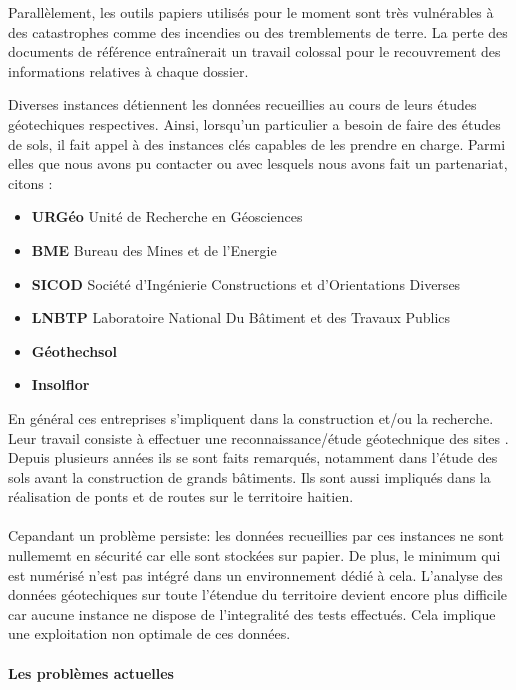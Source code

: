 \par
Parallèlement, les outils papiers utilisés pour le moment sont très vulnérables à des
catastrophes comme des incendies ou des tremblements de terre. La perte 
des documents de référence entraînerait un travail
colossal pour le recouvrement des informations relatives à chaque 
dossier.
\par
Diverses instances détiennent les données recueillies au cours
de leurs études géotechiques respectives. 
Ainsi, lorsqu’un particulier a besoin de faire des études de sols, il 
fait appel à des instances clés capables de les prendre en charge. 
Parmi elles que nous avons pu contacter ou avec lesquels nous avons fait un partenariat, citons :
\begin{itemize}
    \item \textbf{URGéo}
    Unité de Recherche en Géosciences 
    \item \textbf{BME}
    Bureau des Mines et de l’Energie
    \item \textbf{SICOD}
    Société d’Ingénierie Constructions et d’Orientations Diverses
    \item \textbf{LNBTP}
    Laboratoire National Du Bâtiment et des Travaux Publics 
    \item \textbf{Géothechsol}
    \item \textbf{Insolflor}
\end{itemize}   

\par
En général ces entreprises s'impliquent dans la construction et/ou la recherche. 
Leur travail consiste à effectuer une reconnaissance/étude géotechnique des sites .
Depuis plusieurs années ils se sont faits remarqués, notamment dans
l'étude des sols avant la construction de grands bâtiments. Ils sont aussi impliqués
dans la réalisation de ponts et de routes sur le territoire
haitien. 
\paragraph{}
Cepandant un problème persiste: les données recueillies par ces instances
ne sont nullememt en sécurité car elle sont stockées sur papier.
De plus, le minimum qui est numérisé n'est pas intégré dans un environnement 
dédié à cela.
L'analyse des données géotechiques sur toute l'étendue du territoire devient
encore plus difficile car aucune instance ne dispose de l'integralité des tests effectués.
Cela implique une exploitation non optimale de ces données.
\paragraph{Les problèmes actuelles}
